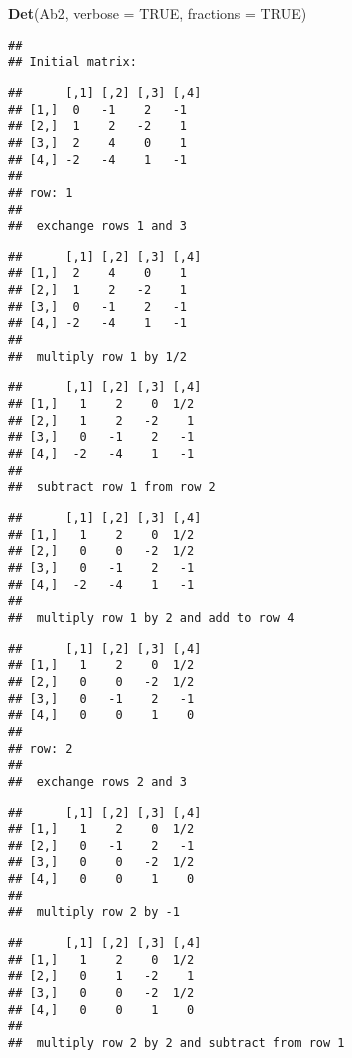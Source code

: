 \documentclass[
  10pt,
  a4paper,
]{article}
\newenvironment{Shaded}{\begin{snugshade}}{\end{snugshade}}
\newcommand{\AttributeTok}[1]{\textcolor[rgb]{0.13,0.29,0.53}{#1}}
\newcommand{\ConstantTok}[1]{\textcolor[rgb]{0.56,0.35,0.01}{#1}}
\newcommand{\FunctionTok}[1]{\textcolor[rgb]{0.13,0.29,0.53}{\textbf{#1}}}
\newcommand{\NormalTok}[1]{#1}
\begin{document}
\begin{Shaded}
\begin{Highlighting}[]
\FunctionTok{Det}\NormalTok{(Ab2, }\AttributeTok{verbose =} \ConstantTok{TRUE}\NormalTok{, }\AttributeTok{fractions =} \ConstantTok{TRUE}\NormalTok{)}
\end{Highlighting}
\end{Shaded}

\begin{verbatim}
## 
## Initial matrix:
\end{verbatim}

\begin{verbatim}
##      [,1] [,2] [,3] [,4]
## [1,]  0   -1    2   -1  
## [2,]  1    2   -2    1  
## [3,]  2    4    0    1  
## [4,] -2   -4    1   -1  
## 
## row: 1 
## 
##  exchange rows 1 and 3
\end{verbatim}

\begin{verbatim}
##      [,1] [,2] [,3] [,4]
## [1,]  2    4    0    1  
## [2,]  1    2   -2    1  
## [3,]  0   -1    2   -1  
## [4,] -2   -4    1   -1  
## 
##  multiply row 1 by 1/2
\end{verbatim}

\begin{verbatim}
##      [,1] [,2] [,3] [,4]
## [1,]   1    2    0  1/2 
## [2,]   1    2   -2    1 
## [3,]   0   -1    2   -1 
## [4,]  -2   -4    1   -1 
## 
##  subtract row 1 from row 2
\end{verbatim}

\begin{verbatim}
##      [,1] [,2] [,3] [,4]
## [1,]   1    2    0  1/2 
## [2,]   0    0   -2  1/2 
## [3,]   0   -1    2   -1 
## [4,]  -2   -4    1   -1 
## 
##  multiply row 1 by 2 and add to row 4
\end{verbatim}

\begin{verbatim}
##      [,1] [,2] [,3] [,4]
## [1,]   1    2    0  1/2 
## [2,]   0    0   -2  1/2 
## [3,]   0   -1    2   -1 
## [4,]   0    0    1    0 
## 
## row: 2 
## 
##  exchange rows 2 and 3
\end{verbatim}

\begin{verbatim}
##      [,1] [,2] [,3] [,4]
## [1,]   1    2    0  1/2 
## [2,]   0   -1    2   -1 
## [3,]   0    0   -2  1/2 
## [4,]   0    0    1    0 
## 
##  multiply row 2 by -1
\end{verbatim}

\begin{verbatim}
##      [,1] [,2] [,3] [,4]
## [1,]   1    2    0  1/2 
## [2,]   0    1   -2    1 
## [3,]   0    0   -2  1/2 
## [4,]   0    0    1    0 
## 
##  multiply row 2 by 2 and subtract from row 1
\end{verbatim}
\end{document}
